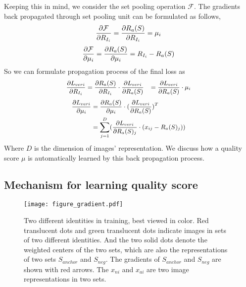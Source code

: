 \documentclass[10pt,twocolumn,letterpaper]{article}
\begin{document}
Keeping this in mind, we consider the set pooling operation $\mathcal{F}$. The gradients back propagated through set pooling unit can be formulated as follows,
\begin{equation}
\small
\label{eq9}
\frac{\partial \mathcal{F}}{\partial R_{I_i}} =\frac{\partial R_a(S)}{\partial R_{I_i}} =\mu_i
\end{equation}
\begin{equation}
\small
\label{10}
\frac{\partial \mathcal{F}}{\partial \mu_i} =\frac{\partial R_a(S)}{\partial \mu_i} = R_{I_i} - R_a(S)
\end{equation}
So we can formulate propagation process of the final loss as
\begin{equation}
\small
\begin{aligned}
\label{11a}
\frac{\partial L_{veri}}{\partial R_{I_i}}
&= \frac{\partial R_a(S)}{\partial R_{I_i}} \cdot \frac{\partial L_{veri}}{\partial R_a(S)}  
&= \frac{\partial L_{veri}}{\partial R_a(S)} \cdot \mu_i
\end{aligned}
\end{equation}
\begin{equation}
\small
\begin{aligned}
\frac{\partial L_{veri}}{\partial \mu_i} &= \frac{\partial R_a(S)}{\partial \mu_i} \cdot (\frac{\partial L_{veri}}{\partial R_a(S)})^T  \\
&= \sum_{j=1}^D ( \frac{\partial L_{veri}}{\partial R_a(S)_j} \cdot ( x_{ij} - R_a(S)_j ) )
\label{11b}
\end{aligned}
\end{equation}
Where $D$ is the dimension of images' representation. We discuss how a quality score $\mu$ is automatically learned by this back propagation process.


\subsection{Mechanism for learning quality score}

\begin{figure}[!htbp]
  \centering
  \texttt{[image: figure\_gradient.pdf]}
  \caption{Two different identities in training, best viewed in color. Red translucent dots and green translucent dots indicate images in sets of two different identities. And the two solid dots denote the weighted centers of the two sets, which are also the representations of two sets $S_{anchor}$ and  $S_{neg}$. The gradients of $S_{anchor}$ and  $S_{neg}$ are shown with red arrows. The $x_{ni}$ and $x_{ai}$ are two image representations in two sets.} 
  \label{fig:gradient}
\end{figure}
\end{document}

